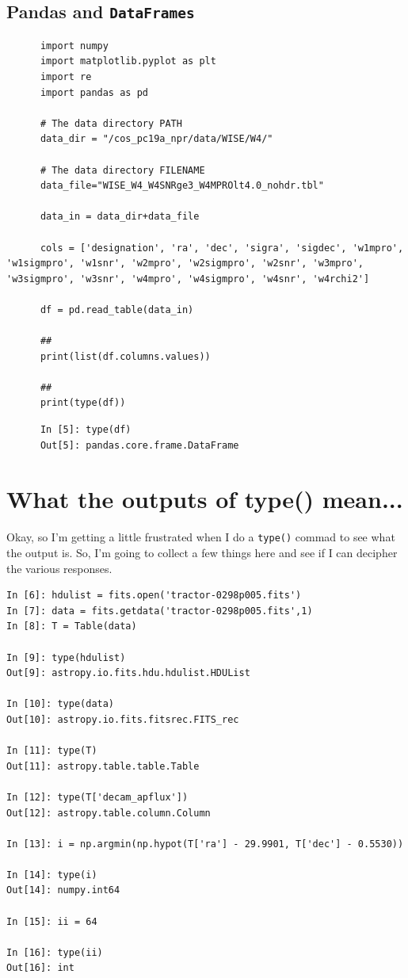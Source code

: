 \documentclass[11pt,a4paper]{article}
\begin{document}
    \subsection{Pandas and {\tt DataFrames}}
    \begin{lstlisting}
      import numpy
      import matplotlib.pyplot as plt
      import re
      import pandas as pd 
      
      # The data directory PATH
      data_dir = "/cos_pc19a_npr/data/WISE/W4/"
      
      # The data directory FILENAME
      data_file="WISE_W4_W4SNRge3_W4MPROlt4.0_nohdr.tbl"
      
      data_in = data_dir+data_file
      
      cols = ['designation', 'ra', 'dec', 'sigra', 'sigdec', 'w1mpro', 'w1sigmpro', 'w1snr', 'w2mpro', 'w2sigmpro', 'w2snr', 'w3mpro', 'w3sigmpro', 'w3snr', 'w4mpro', 'w4sigmpro', 'w4snr', 'w4rchi2']
      
      df = pd.read_table(data_in) 
      
      ##
      print(list(df.columns.values))
      
      ## 
      print(type(df))
    \end{lstlisting}
    
    \begin{lstlisting}
      In [5]: type(df)
      Out[5]: pandas.core.frame.DataFrame
    \end{lstlisting}



\newpage
\section{What the outputs of type() mean...}
Okay, so I'm getting a little frustrated when I do a {\tt type()} commad to see what the output is. 
So, I'm going to collect a few things here and see if I can decipher the various responses. 

\begin{lstlisting}
In [6]: hdulist = fits.open('tractor-0298p005.fits')
In [7]: data = fits.getdata('tractor-0298p005.fits',1)
In [8]: T = Table(data)

In [9]: type(hdulist)
Out[9]: astropy.io.fits.hdu.hdulist.HDUList

In [10]: type(data)
Out[10]: astropy.io.fits.fitsrec.FITS_rec

In [11]: type(T)
Out[11]: astropy.table.table.Table

In [12]: type(T['decam_apflux'])
Out[12]: astropy.table.column.Column

In [13]: i = np.argmin(np.hypot(T['ra'] - 29.9901, T['dec'] - 0.5530))

In [14]: type(i)
Out[14]: numpy.int64

In [15]: ii = 64

In [16]: type(ii)
Out[16]: int
\end{lstlisting}
    
\end{document}
